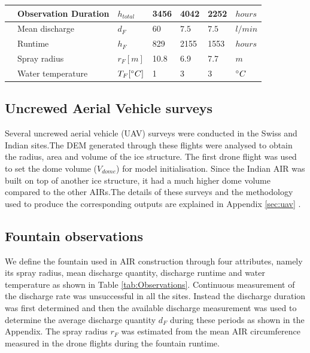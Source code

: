 \documentclass[utf8]{frontiersSCNS} %
\begin{document}
\begin{table}
\begin{tabular}{@{}|lllllll|@{}}
		\multicolumn{1}{|l|}{} & Observation Duration        & $h_{total} $        & 3456          & 4042
		                       & 2252                        & $hours$                                                                        \\\bottomrule
		\multicolumn{1}{|l|}{\multirow{4}{*}{\rotatebox[origin=c]{90}{Fountain}}}
		                       & Mean discharge              & $d_F     $          & $60$          & $7.5$        &
		$7.5$                  & $l/min$                                                                                                      \\
		\multicolumn{1}{|l|}{} & Runtime                     & $h_F $              & 829           & 2155
		                       & 1553                        & $hours$                                                                        \\
		\multicolumn{1}{|l|}{} & Spray radius                & $r_{F} [m]$         & 10.8          & 6.9
		                       & 7.7                         & $m$                                                                            \\
		\multicolumn{1}{|l|}{} & Water temperature           & $T_{F} [\degree C]$ & 1             & 3
		                       & 3                           & $\degree C$                                                                    \\\midrule
	\end{tabular}
\end{table}

\subsection{Uncrewed Aerial Vehicle surveys}

Several uncrewed aerial vehicle (UAV) surveys were conducted in the Swiss and Indian sites.The DEM generated
through these flights were analysed to obtain the radius, area and volume of the ice structure.  The first drone
flight was used to set the dome volume ($V_{dome}$) for model initialisation. Since the Indian AIR was built on top
of another ice structure, it had a much higher dome volume compared to the other AIRs.The details of these surveys
and the methodology used to produce the corresponding outputs are explained in Appendix \ref{sec:uav} .

\subsection{Fountain observations}
We define the fountain used in AIR construction through four attributes, namely its spray radius, mean discharge
quantity, discharge runtime and water temperature as shown in Table \ref{tab:Observations}. Continuous measurement of
the discharge rate was unsuccessful in all the sites. Instead the discharge duration was first determined and then the
available discharge measurement was used to determine the average discharge quantity $d_F$ during these periods as shown
in the Appendix. The spray radius $r_F$ was estimated from the mean AIR circumference measured in the drone flights
during the fountain runtime.
\end{document}
